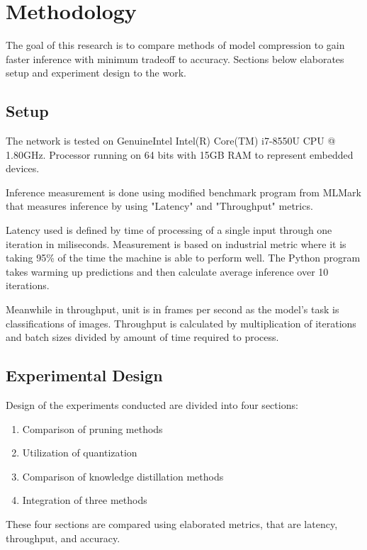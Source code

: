 

    \chapter{Methodology}

    The goal of this research is to compare methods of model compression to gain faster inference with minimum tradeoff to accuracy. Sections below elaborates setup and experiment design to the work. 

    \section{Setup}
    The network is tested on GenuineIntel Intel(R) Core(TM) i7-8550U CPU @ 1.80GHz. Processor running on 64 bits with 15GB RAM to represent embedded devices.
    
    Inference measurement is done using  modified benchmark program from MLMark that measures inference by using "Latency" and "Throughput" metrics.
    
    Latency used is defined by time of processing of a single input through one iteration in miliseconds. Measurement is based on industrial metric where it is taking 95\% of the time the machine is able to perform well. The Python program takes warming up predictions and then calculate average inference over 10 iterations.
    
    Meanwhile in throughput, unit is in frames per second as the model's task is classifications of images. Throughput is calculated by multiplication of iterations and batch sizes divided by amount of time required to process. 

    \section{Experimental Design}
    Design of the experiments conducted are divided into four sections:
    \begin{enumerate}
    	\item Comparison of pruning methods
    	\item Utilization of quantization
    	\item Comparison of knowledge distillation methods
    	\item Integration of three methods
    \end{enumerate}
    These four sections are compared using elaborated metrics, that are latency, throughput, and accuracy.
    
